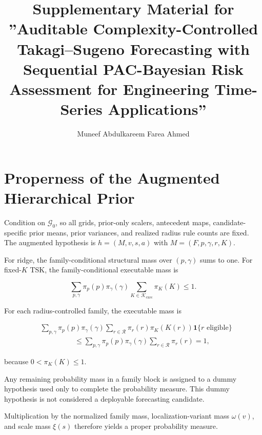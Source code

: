 \documentclass[12pt,draftclsnofoot,onecolumn]{IEEEtran}
\begin{document}
	
	\title{Supplementary Material for ''Auditable Complexity-Controlled Takagi--Sugeno Forecasting with Sequential PAC-Bayesian Risk Assessment for Engineering Time-Series Applications''}
	
	\author{Muneef Abdulkareem Farea Ahmed}
	
	\maketitle
	
	
	\section{Properness of the Augmented Hierarchical Prior}
	\label{sup:prior}
	
	Condition on $\mathcal G_0$, so all grids, prior-only scalers, antecedent maps, candidate-specific prior means, prior variances, and realized radius rule counts are fixed. The augmented hypothesis is $h=(M,v,s,a)$ with
	$M=(F,p,\gamma,r,K)$.
	
	For ridge, the family-conditional structural mass over $(p,\gamma)$ sums to one. For fixed-$K$ TSK, the family-conditional executable mass is
	
	\begin{equation}
		\sum_{p,\gamma}\pi_p(p)\pi_\gamma(\gamma)
		\sum_{K\in\mathcal K_{\mathrm{exec}}}\pi_K(K)\le 1 .
	\end{equation}
	
	For each radius-controlled family, the executable mass is
	
	\begin{align}
		&\sum_{p,\gamma}\pi_p(p)\pi_\gamma(\gamma)
		\sum_{r\in\mathcal R}\pi_r(r)\pi_K(K(r))
		\mathbf 1\{r\text{ eligible}\}
		\nonumber\\
		&\hspace{2cm}\le
		\sum_{p,\gamma}\pi_p(p)\pi_\gamma(\gamma)
		\sum_{r\in\mathcal R}\pi_r(r)
		=1 ,
	\end{align}
	
	because $0<\pi_K(K)\le1$.
	
	Any remaining probability mass in a family block is assigned to a dummy hypothesis used only to complete the probability measure. This dummy hypothesis is not considered a deployable forecasting candidate.
	
	Multiplication by the normalized family mass, localization-variant mass $\omega(v)$, and scale mass $\xi(s)$ therefore yields a proper probability measure.
	
\end{document}
